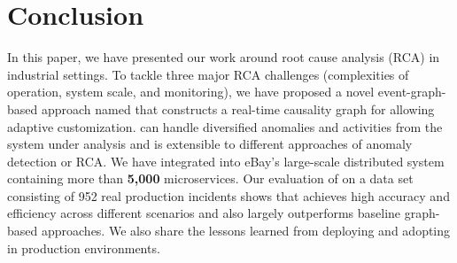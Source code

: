 \section{Conclusion}

In this paper, we have presented our work around root cause analysis (RCA) in industrial settings. To tackle three major RCA challenges (complexities of operation, system scale, and monitoring), we have proposed a novel event-graph-based approach named  \system that constructs a real-time causality graph for allowing adaptive customization. 
\system can handle diversified anomalies and activities from the system under analysis and is extensible to different approaches of anomaly detection or RCA. We have integrated \system into eBay's large-scale distributed system  containing more than \textbf{5,000} microservices. Our evaluation of \system on a data set consisting of 952 real production incidents shows that \system achieves high accuracy and efficiency across different scenarios and also largely outperforms  baseline graph-based approaches. We also share the lessons learned from deploying and adopting \system in production environments.
